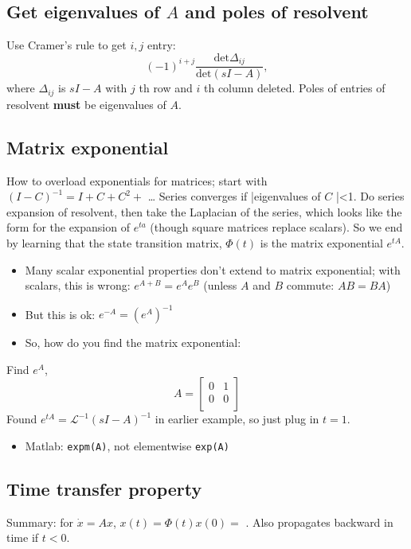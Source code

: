\documentclass[10pt,letterpaper]{article}
\begin{document}
\subsection{Get eigenvalues of $A$ and poles of resolvent}
\label{sec-9_5}

Use Cramer's rule to get $i,j$ entry:
$$
(-1) ^{i+j} \frac{\text{det} \Delta _{ij}}{\text{det}(sI-A)},
$$
where $\Delta _{ij}$ is $sI-A$ with $j$ th row and $i$ th column deleted. Poles of entries of resolvent \textbf{must} be eigenvalues of $A$.
\subsection{Matrix exponential}
\label{sec-9_6}

How to overload exponentials for matrices; start with $(I-C) ^{-1}= I + C + C ^{2} +$ \ldots{} Series converges if |eigenvalues of $C$ |<1.
Do series expansion of resolvent, then take the Laplacian of the series, which looks like the form for the expansion of $e ^{ta}$ (though square matrices replace scalars). So we end by learning that the state transition matrix, $\Phi(t)$ is the matrix exponential $e ^{tA}$.
\begin{itemize}
\item Many scalar exponential properties don't extend to matrix exponential; with scalars, this is wrong: $e ^{A+B} = e ^{A} e ^{B}$ (unless $A$ and $B$ commute: $AB=BA$)
\item But this is ok: $e ^{-A} = (e ^{A} ) ^{-1}$
\item So, how do you find the matrix exponential:
\end{itemize}
Find $e^A$,
$$
A=
\begin{bmatrix}
  0 & 1 \\
  0 & 0 \\
\end{bmatrix}
$$ 
Found $e ^{tA} = \mathcal L ^{-1} (sI-A) ^{-1}$ in earlier example, so just plug in $t=1$.
\begin{itemize}
\item Matlab: \texttt{expm(A)}, not elementwise \texttt{exp(A)}
\end{itemize}
\subsection{Time transfer property}
\label{sec-9_7}

Summary: for $\dot x = Ax$, $x(t) = \Phi (t)x(0) =$ .  Also propagates backward in time if $t<0$.
\end{document}
